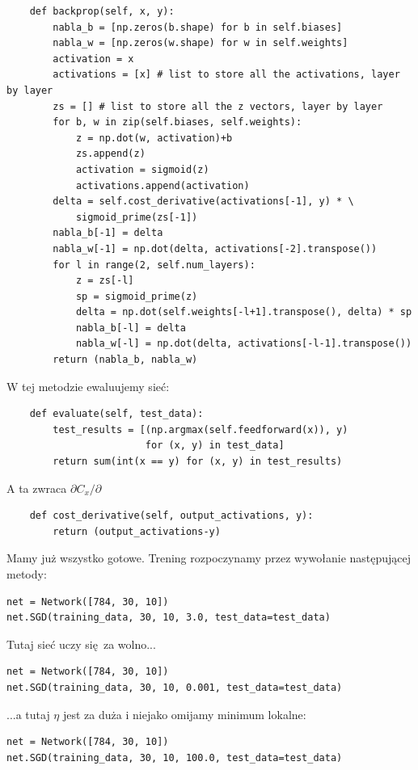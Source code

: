 \documentclass[10pt, oneside]{article}
\theoremstyle{remark}
\begin{document}
\begin{verbatim}
    def backprop(self, x, y):
        nabla_b = [np.zeros(b.shape) for b in self.biases]
        nabla_w = [np.zeros(w.shape) for w in self.weights]
        activation = x
        activations = [x] # list to store all the activations, layer by layer
        zs = [] # list to store all the z vectors, layer by layer
        for b, w in zip(self.biases, self.weights):
            z = np.dot(w, activation)+b
            zs.append(z)
            activation = sigmoid(z)
            activations.append(activation)
        delta = self.cost_derivative(activations[-1], y) * \
            sigmoid_prime(zs[-1])
        nabla_b[-1] = delta
        nabla_w[-1] = np.dot(delta, activations[-2].transpose())
        for l in range(2, self.num_layers):
            z = zs[-l]
            sp = sigmoid_prime(z)
            delta = np.dot(self.weights[-l+1].transpose(), delta) * sp
            nabla_b[-l] = delta
            nabla_w[-l] = np.dot(delta, activations[-l-1].transpose())
        return (nabla_b, nabla_w)
\end{verbatim}
W tej metodzie ewaluujemy sieć:
\begin{verbatim}
    def evaluate(self, test_data):
        test_results = [(np.argmax(self.feedforward(x)), y)
                        for (x, y) in test_data]
        return sum(int(x == y) for (x, y) in test_results)
\end{verbatim}
A ta zwraca $\partial C_x / \partial$
\begin{verbatim}
    def cost_derivative(self, output_activations, y):
        return (output_activations-y)
\end{verbatim}


Mamy już wszystko gotowe. 
Trening rozpoczynamy przez wywołanie następującej metody:
\begin{verbatim}
net = Network([784, 30, 10])
net.SGD(training_data, 30, 10, 3.0, test_data=test_data)	
\end{verbatim}
Tutaj sieć uczy się za wolno...
\begin{verbatim}
net = Network([784, 30, 10])
net.SGD(training_data, 30, 10, 0.001, test_data=test_data)	
\end{verbatim}
...a tutaj $\eta$ jest za duża i niejako omijamy minimum lokalne:
\begin{verbatim}
net = Network([784, 30, 10])
net.SGD(training_data, 30, 10, 100.0, test_data=test_data)	
\end{verbatim}
\end{document}
